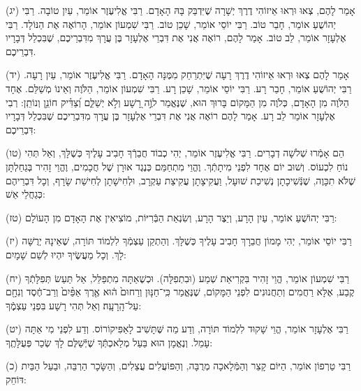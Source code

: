 \documentclass[twoside, openany, parskip=half, 11pt]{book}
\begin{document}
(יג)
 אָמַר לָהֶם, צְאוּ וּרְאוּ אֵיזוֹהִי דֶרֶךְ יְשָׁרָה שֶׁיִּדְבַּק בָּהּ הָאָדָם.
רַבִּי אֱלִיעֶזֶר אוֹמֵר, עַיִן טוֹבָה.
רַבִּי יְהוֹשֻׁעַ אוֹמֵר, חָבֵר טוֹב.
רַבִּי יוֹסֵי אוֹמֵר, שָׁכֵן טוֹב.
רַבִּי שִׁמְעוֹן אוֹמֵר, הָרוֹאֶה אֶת הַנּוֹלָד.
רַבִּי אֶלְעָזָר אוֹמֵר, לֵב טוֹב.
אָמַר לָהֶם, רוֹאֶה אֲנִי אֶת דִּבְרֵי אֶלְעָזָר בֶּן עֲרָךְ מִדִּבְרֵיכֶם, שֶׁבִּכְלַל דְּבָרָיו דִּבְרֵיכֶם.

(יד)
אָמַר לָהֶם צְאוּ וּרְאוּ אֵיזוֹהִי דֶרֶךְ רָעָה שֶׁיִּתְרַחֵק מִמֶּנָּה הָאָדָם.
רַבִּי אֱלִיעֶזֶר אוֹמֵר, עַיִן רָעָה.
רַבִּי יְהוֹשֻׁעַ אוֹמֵר, חָבֵר רָע.
רַבִּי יוֹסֵי אוֹמֵר, שָׁכֵן רָע.
רַבִּי שִׁמְעוֹן אוֹמֵר, הַלֹּוֶה וְאֵינוֹ מְשַׁלֵּם. אֶחָד הַלֹּוֶה מִן הָאָדָם, כְּלֹוֶה מִן הַמָּקוֹם בָּרוּךְ הוּא, שֶׁנֶּאֱמַר 
 לוֶֹ֣ה רָ֭שָׁע וְלֹ֣א יְשַׁלֵּ֑ם וְ֝צַדִּ֗יק חוֹנֵ֥ן וְנוֹתֵֽן: רְבִי אֶלְעָזָר אוֹמֵר לֵב רָע. אָמַר לָהֶם רוֹאֶה אֲנִי אֶת דִּבְרֵי אֶלְעָזָר בֶּן עֲרָךְ מִדִּבְרֵיכֶם שֶׁבִּכְלַל דְּבָרָיו דִּבְרֵיכֶם:

(טו)
 הֵם אָמְֿרוּ שְׁלשָׁה דְבָרִים. רַבִּי אֱלִיעֶזֶר אוֹמֵר, יְהִי כְבוֹד חֲבֵרְֿךָ חָבִיב עָלֶיךָ כְּשֶׁלָּךְ, וְאַל תְּהִי נוֹחַ לִכְעוֹס. וְשׁוּב יוֹם אֶחָד לִפְנֵי מִיתָתְֿךְ. וֶהֱוֵי מִתְחַמֵּם כְּנֶגֶד אוּרָן שֶׁל חֲכָמִים, וֶהֱוֵי זָהִיר בְּגַחַלְתָּן שֶׁלֹּא תִכָּוֶה, שֶׁנְּֿשִׁיכָתָן נְשִׁיכַת שׁוּעָל, וַעֲקִיצָתָן עֲקִיצַת עַקְרָב, וּלְחִישָׁתָן לְחִישַׁת שָׂרָף, וְכָל דִּבְרֵיהֶם כְּגַחֲלֵי אֵשׁ:

(טז)
 רַבִּי יְהוֹשֻׁעַ אוֹמֵר, עַיִן הָרָע, וְיֵצֶר הָרָע, וְשִׂנְאַת הַבְּֿרִיּוֹת, מוֹצִיאִין אֶת הָאָדָם מִן הָעוֹלָם:

(יז) רַבִּי יוֹסֵי אוֹמֵר, יְהִי מָמוֹן חֲבֵרָךְ חָבִיב עָלֶיךָ כְּשֶׁלָּךְ. וְהַתְקֵן עַצְמְֿךָ לִלְמוֹד תּוֹרָה, שֶׁאֵינָהּ יְרֻשָּׁה לָךְ. וְכָל מַעֲשֶׂיךָ יִהְיוּ לְשֵׁם שָׁמָיִם:

(יח)
 רַבִּי שִׁמְעוֹן אוֹמֵר, הֱוֵי זָהִיר בִּקְרִיאַת שְׁמַע (וּבִתְפִלָּה). וּכְשֶׁאַתָּה מִתְפַּלֵּל, אַל תַּעַשׂ תְּפִלָּתְֿךָ קֶבַע, אֶלָּא רַחֲמִים וְתַחֲנוּנִים לִפְנֵי הַמָּקוֹם, שֶׁנֶּאֱמַר 
כִּֽי־חַנּ֤וּן וְרַחוּם֙ ה֔וּא אֶ֤רֶךְ אַפַּ֨יִם֙ וְרַב־חֶ֔סֶד וְנִחָ֖ם עַל־הָֽרָעָֽה׃ וְאַל תְּהִי רָשָׁע בִּפְנֵי עַצְמֶֽֿךָ:

(יט)
 רַבִּי אֶלְעָזָר אוֹמֵר, הֱוֵי שָׁקוּד לִלְמוֹד תּוֹרָה, וְדַע מַה שֶּׁתָּשִׁיב לָאַפִּיקוֹרוֹס. וְדַע לִפְנֵי מִי אַתָּה עָמֵל. וְנֶאֱמָן הוּא בַּעַל מְלַאכְתְּֿךָ שֶׁיְּֿשַׁלֶּם לָךְ שְׂכַר פְּעֻלָּתֶֽךָ:


(כ)
 רַבִּי טַרְפוֹן אוֹמֵר, הַיּוֹם קָצֵר וְהַמְּֿלָאכָה מְרֻבָּה, וְהַפּוֹעֲלִים עֲצֵלִים, וְהַשָּׂכָר הַרְבֵּה, וּבַעַל הַבַּיִת דּוֹחֵק:
\end{document}
